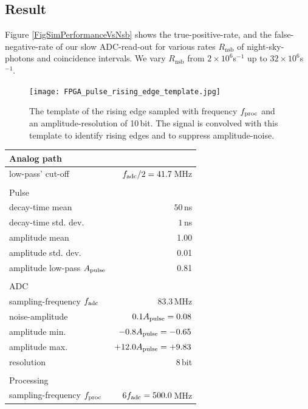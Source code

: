 \documentclass{article}%
\begin{document}
\begin{multicols}{2}
\section*{Result}
%
Figure \ref{FigSimPerformanceVsNsb} shows the true-positive-rate, and the false-negative-rate of our slow ADC-read-out for various rates $R_\text{nsb}$ of night-sky-photons and coincidence intervals.
%
We vary $R_\text{nsb}$ from $2\times10^6$s$^{-1}$ up to $32\times10^6$s$^{-1}$.
%
\begin{figure}[H]%
\centering%
\texttt{[image: FPGA\_pulse\_rising\_edge\_template.jpg]}%
\caption{
The template of the rising edge sampled with frequency $f_\text{proc}{}$ and an amplitude-resolution of 10\,bit. The signal is convolved with this template to identify rising edges and to suppress amplitude-noise.
}%
\label{FigSimRisingEdgeTemplate}
\end{figure}
%
\begin{table}[H]
    \begin{center}
        \begin{tabular}{lr}
            Analog path & \\
            \hline
            low-pass' cut-off & $f_\text{adc}{}/2 = 41.7$\,MHz\\
            &\\
            Pulse & \\
            \hline
            decay-time mean & $50$\,ns\\
            decay-time std. dev. & $1$\,ns\\
            amplitude mean & 1.00\\
            amplitude std. dev. & 0.01\\
            amplitude low-pass $A_\text{pulse}{}$ & 0.81\\
            &\\
            ADC & \\
            \hline
            sampling-frequency $f_\text{adc}{}$ &$83.3$\,MHz\\
            noise-amplitude & $0.1A_\text{pulse}{} = 0.08$\\
            amplitude min. & $-0.8A_\text{pulse}{} = -0.65$\\
            amplitude max. & $+12.0A_\text{pulse}{} = +9.83$\\
            resolution & 8\,bit\\
            &\\
            Processing & \\
            \hline
            sampling-frequency $f_\text{proc}{}$& $6f_\text{adc}{} = 500.0$\,MHz\\

\end{tabular}
\end{center}
\end{table}
\end{multicols}
\end{document}
